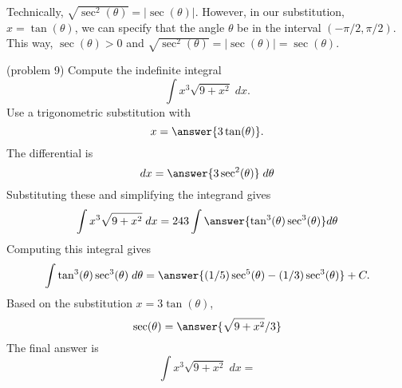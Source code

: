 \documentclass[handout]{ximera}
\begin{document}
\begin{remark}
Technically, $\sqrt{\sec^2(\theta)} = |\sec(\theta)|$. However, in our substitution, $x = \tan(\theta)$,
we can specify that the angle $\theta$ be in the interval $(-\pi/2, \pi/2)$. This way, 
$\sec(\theta) > 0$ and $\sqrt{\sec^2(\theta)} = |\sec(\theta)| = \sec(\theta)$.
\end{remark}




\begin{problem}(problem 9)
Compute the indefinite integral
\[
\int   x^3\sqrt{9 + x^2}\; dx.
\]
Use a trigonometric substitution with\\
\[
x = \answer{3\tan(\theta)}.
\]
The differential is\\
\[
dx = \answer{3\sec^2(\theta)} \; d\theta
\]
Substituting these and simplifying the integrand gives\\
\[
\int   x^3\sqrt{9 + x^2}\; dx = 243\int \answer{\tan^3(\theta)\sec^3(\theta)} d\theta
\]
Computing this integral gives
\[
\int \tan^3(\theta)\sec^3(\theta) \; d\theta = \answer{(1/5)\sec^5(\theta) - (1/3)\sec^3(\theta)} + C.
\]
Based on the substitution $x = 3\tan(\theta)$, \\
\[
\sec(\theta) = \answer{\sqrt{9+x^2}/3}
\]
The final answer is
\[
\int   x^3\sqrt{9 + x^2}\; dx = 
\]
\begin{center}
\begin{multipleChoice}
\end{multipleChoice}
\end{center}
\end{problem}
\end{document}
